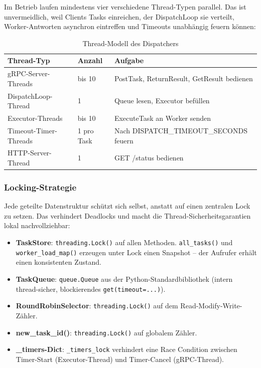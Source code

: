 Im Betrieb laufen mindestens vier verschiedene Thread-Typen parallel.
Das ist unvermeidlich, weil Clients Tasks einreichen, der DispatchLoop sie verteilt,
Worker-Antworten asynchron eintreffen und Timeouts unabhängig feuern können:

\begin{table}[H]
\centering
\begin{tabular}{lll}
\toprule
\textbf{Thread-Typ} & \textbf{Anzahl} & \textbf{Aufgabe} \\
\midrule
gRPC-Server-Threads    & bis 10 & PostTask, ReturnResult, GetResult bedienen \\
DispatchLoop-Thread    & 1      & Queue lesen, Executor befüllen \\
Executor-Threads       & bis 10 & ExecuteTask an Worker senden \\
Timeout-Timer-Threads  & 1 pro Task & Nach DISPATCH\_TIMEOUT\_SECONDS feuern \\
HTTP-Server-Thread     & 1      & GET /status bedienen \\
\bottomrule
\end{tabular}
\caption{Thread-Modell des Dispatchers}
\end{table}

\subsubsection*{Locking-Strategie}

Jede geteilte Datenstruktur schützt sich selbst, anstatt auf einen zentralen Lock
zu setzen. Das verhindert Deadlocks und macht die Thread-Sicherheitsgarantien
lokal nachvollziehbar:

\begin{itemize}
  \item \textbf{TaskStore}: \texttt{threading.Lock()} auf allen Methoden.
        \texttt{all\_tasks()} und \texttt{worker\_load\_map()} erzeugen unter Lock
        einen Snapshot -- der Aufrufer erhält einen konsistenten Zustand.
  \item \textbf{TaskQueue}: \texttt{queue.Queue} aus der Python-Standardbibliothek
        (intern thread-sicher, blockierendes \texttt{get(timeout=...)}).
  \item \textbf{RoundRobinSelector}: \texttt{threading.Lock()} auf dem
        Read-Modify-Write-Zähler.
  \item \textbf{new\_task\_id()}: \texttt{threading.Lock()} auf globalem Zähler.
  \item \textbf{\_timers-Dict}: \texttt{\_timers\_lock} verhindert eine Race Condition
        zwischen Timer-Start (Executor-Thread) und Timer-Cancel (gRPC-Thread).
\end{itemize}

